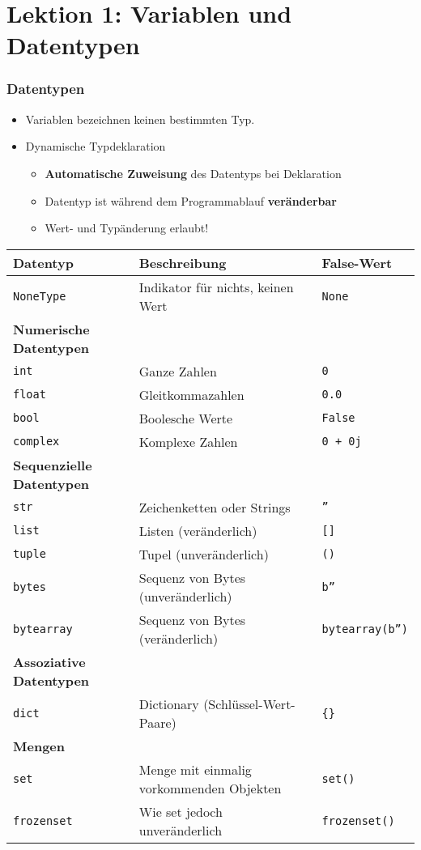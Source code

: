 \part{Lektion 1: Variablen und Datentypen}
\section{Datentypen}
\begin{itemize}
	\item Variablen bezeichnen keinen bestimmten Typ.
	\item Dynamische Typdeklaration
	\begin{itemize}
		\item \textbf{Automatische Zuweisung} des Datentyps bei Deklaration
		\item Datentyp ist während dem Programmablauf \textbf{veränderbar}
		\item Wert- und Typänderung erlaubt!
	\end{itemize}
\end{itemize}
\begin{tabular}{|l|l|l|}
	\hline 
	\textbf{Datentyp} &\textbf{Beschreibung} &\textbf{False-Wert}\\
	\hline
	\texttt{NoneType} &Indikator für nichts, keinen Wert &\texttt{None}\\ 
	\hline
	\textbf{Numerische Datentypen}&&\\
	\texttt{int} &Ganze Zahlen &\texttt{0}\\ 
	\texttt{float} &Gleitkommazahlen &\texttt{0.0}\\ 
	\texttt{bool} &Boolesche Werte &\texttt{False}\\ 
	\texttt{complex} &Komplexe Zahlen &\texttt{0 + 0j}\\ 
	\hline 
	\textbf{Sequenzielle Datentypen}&&\\
	\texttt{str} &Zeichenketten oder Strings &\texttt{''}\\
	\texttt{list} &Listen (veränderlich) &\texttt{[]}\\
	\texttt{tuple} &Tupel (unveränderlich) &\texttt{()}\\
	\texttt{bytes} &Sequenz von Bytes (unveränderlich) &\texttt{b''}\\
	\texttt{bytearray} &Sequenz von Bytes (veränderlich) &\texttt{bytearray(b'')}\\
	\hline
	\textbf{Assoziative Datentypen}&&\\
	\texttt{dict} &Dictionary (Schlüssel-Wert-Paare) &\texttt{\{\}}\\
	\hline
	\textbf{Mengen}&&\\
	\texttt{set} &Menge mit einmalig vorkommenden Objekten &\texttt{set()}\\
	\texttt{frozenset} &Wie set jedoch unveränderlich &\texttt{frozenset()}\\
	\hline
\end{tabular}\\
